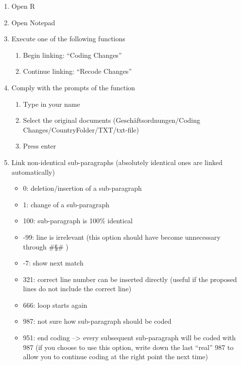 \documentclass[10pt,]{article}
\providecommand{\tightlist}{%
  \setlength{\itemsep}{0pt}\setlength{\parskip}{0pt}}
\begin{document}
\begin{enumerate}
\def\labelenumi{\arabic{enumi})}
\tightlist
\item
  Open R
\item
  Open Notepad
\item
  Execute one of the following functions

  \begin{enumerate}
  \def\labelenumii{\alph{enumii}.}
  \tightlist
  \item
    Begin linking: ``Coding Changes''
  \item
    Continue linking: ``Recode Changes''
  \end{enumerate}
\item
  Comply with the prompts of the function

  \begin{enumerate}
  \def\labelenumii{\alph{enumii}.}
  \tightlist
  \item
    Type in your name
  \item
    Select the original documents (Geschäftsordnungen/Coding
    Changes/CountryFolder/TXT/txt-file)
  \item
    Press enter
  \end{enumerate}
\item
  Link non-identical sub-paragraphs (absolutely identical ones are
  linked automatically)

  \begin{itemize}
  \tightlist
  \item
    0: deletion/insertion of a sub-paragraph
  \item
    1: change of a sub-paragraph
  \item
    100: sub-paragraph is 100\% identical
  \item
    -99: line is irrelevant (this option should have become unnecessary
    through \#§\# )
  \item
    -7: show next match
  \item
    321: correct line number can be inserted directly (useful if the
    proposed lines do not include the correct line)
  \item
    666: loop starts again
  \item
    987: not sure how sub-paragraph should be coded
  \item
    951: end coding --\textgreater{} every subsequent sub-paragraph will
    be coded with 987 (if you choose to use this option, write down the
    last ``real'' 987 to allow you to continue coding at the right point
    the next time)
  \end{itemize}
\end{enumerate}
\end{document}
